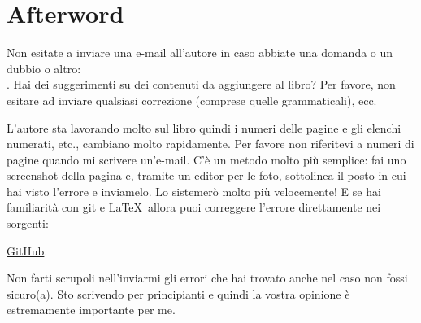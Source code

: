 \part*{Afterword}


Non esitate a inviare una e-mail all'autore in caso abbiate una domanda o un dubbio o altro: \\
\GTT{\EMAILS}.
Hai dei suggerimenti su dei contenuti da aggiungere al libro?
Per favore, non esitare ad inviare qualsiasi correzione (comprese quelle grammaticali), ecc.

L'autore sta lavorando molto sul libro quindi i numeri delle pagine e gli elenchi numerati, etc., cambiano molto rapidamente.
Per favore non riferitevi a numeri di pagine quando mi scrivere un'e-mail.
C'è un metodo molto più semplice: fai uno screenshot della pagina e, tramite un editor per le foto, sottolinea il posto in cui hai visto l'errore
e inviamelo. Lo sistemerò molto più velocemente!
E se hai familiarità con git e \LaTeX\, allora puoi correggere l'errore direttamente nei sorgenti:

\href{http://go.yurichev.com/17089}{GitHub}.

Non farti scrupoli nell'inviarmi gli errori che hai trovato anche nel caso non fossi sicuro(a).
Sto scrivendo per principianti e quindi la vostra opinione è estremamente importante per me.
